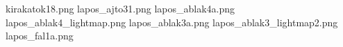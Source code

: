 kirakatok18.png
lapos_ajto31.png
lapos_ablak4a.png
lapos_ablak4_lightmap.png
lapos_ablak3a.png
lapos_ablak3_lightmap2.png
lapos_fal1a.png
